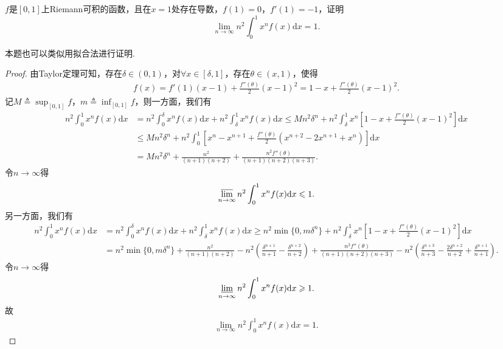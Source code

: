 \documentclass[../../main.tex]{subfiles}
\begin{document}
\begin{example}
$f$是$[0,1]$上Riemann可积的函数，且在$x=1$处存在导数，$f(1)=0$，$f'(1)=-1$，证明$$\lim\limits_{n \to \infty} n^2 \int_0^1 x^n f(x) \mathrm{d}x = 1.$$
\end{example}
\begin{note}
本题也可以类似用拟合法进行证明.
\end{note}
\begin{proof}
由Taylor定理可知，存在$\delta \in (0,1)$，对$\forall x\in [\delta,1]$，存在$\theta \in (x,1)$，使得
\begin{align*}
f(x) = f'(1)(x-1) + \frac{f''(\theta)}{2}(x-1)^2 = 1 - x + \frac{f''(\theta)}{2}(x-1)^2.
\end{align*}
记$M \triangleq \sup_{[0,1]}f$，$m \triangleq \inf_{[0,1]}f$，则一方面，我们有
\begin{align*}
n^2\int_0^1 x^n f(x) \mathrm{d}x &= n^2\int_0^\delta x^n f(x) \mathrm{d}x + n^2\int_\delta^1 x^n f(x) \mathrm{d}x \leqslant Mn^2\delta^n + n^2\int_\delta^1 x^n \left[1 - x + \frac{f''(\theta)}{2}(x - 1)^2\right] \mathrm{d}x \\
&\leqslant Mn^2\delta^n + n^2\int_0^1 \left[x^n - x^{n+1} + \frac{f''(\theta)}{2}(x^{n+2} - 2x^{n+1} + x^n)\right] \mathrm{d}x \\
&= Mn^2\delta^n + \frac{n^2}{(n+1)(n+2)} + \frac{n^2 f''(\theta)}{(n+1)(n+2)(n+3)}.
\end{align*}
令$n \to \infty$得
\begin{align*}
\varlimsup_{n \to \infty} n^2\int_0^1 x^n f(x) \mathrm{d}x \leqslant 1.
\end{align*}
另一方面，我们有
\begin{align*}
n^2\int_0^1 x^n f(x) \mathrm{d}x &= n^2\int_0^\delta x^n f(x) \mathrm{d}x + n^2\int_\delta^1 x^n f(x) \mathrm{d}x \geqslant n^2\min\{0, m\delta^n\} + n^2\int_\delta^1 x^n \left[1 - x + \frac{f''(\theta)}{2}(x - 1)^2\right] \mathrm{d}x \\
&= n^2\min\{0, m\delta^n\} + \frac{n^2}{(n+1)(n+2)} - n^2\left(\frac{\delta^{n+1}}{n+1} - \frac{\delta^{n+2}}{n+2}\right) + \frac{n^2 f''(\theta)}{(n+1)(n+2)(n+3)} - n^2\left(\frac{\delta^{n+3}}{n+3} - \frac{2\delta^{n+2}}{n+2} + \frac{\delta^{n+1}}{n+1}\right).
\end{align*}
令$n \to \infty$得
\begin{align*}
\varliminf_{n \to \infty} n^2\int_0^1 x^n f(x) \mathrm{d}x \geqslant 1.
\end{align*}
故
\begin{align*}
\lim_{n \to \infty} n^2\int_0^1 x^n f(x) \mathrm{d}x = 1.
\end{align*}
\end{proof}
\end{document}
